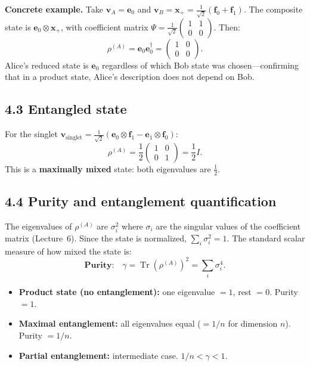 \documentclass[12pt,a4paper]{article}
\begin{document}
\medskip
\noindent\textbf{Concrete example.}  Take $\mathbf{v}_A = \mathbf{e}_0$ and $\mathbf{v}_B = \mathbf{x}_+ = \frac{1}{\sqrt{2}}(\mathbf{f}_0+\mathbf{f}_1)$.  The composite state is $\mathbf{e}_0\otimes\mathbf{x}_+$, with coefficient matrix $\Psi = \frac{1}{\sqrt{2}}\begin{pmatrix}1&1\\0&0\end{pmatrix}$.  Then:
\[
    \rho^{(A)} = \mathbf{e}_0\mathbf{e}_0^\dagger = \begin{pmatrix}1&0\\0&0\end{pmatrix}.
\]
Alice's reduced state is $\mathbf{e}_0$ regardless of which Bob state was chosen---confirming that in a product state, Alice's description does not depend on Bob.

\subsection{4.3 Entangled state}
For the singlet $\mathbf{v}_{\text{singlet}}=\frac{1}{\sqrt{2}}(\mathbf{e}_0\otimes\mathbf{f}_1-\mathbf{e}_1\otimes\mathbf{f}_0)$:
\[
    \rho^{(A)} = \frac{1}{2}\begin{pmatrix}1&0\\0&1\end{pmatrix} = \frac{1}{2}I.
\]
This is a \textbf{maximally mixed} state: both eigenvalues are $\frac{1}{2}$.

\medskip
\noindent{}

\subsection{4.4 Purity and entanglement quantification}
The eigenvalues of $\rho^{(A)}$ are $\sigma_i^2$ where $\sigma_i$ are the singular values of the coefficient matrix (Lecture~6).  Since the state is normalized, $\sum_i \sigma_i^2 = 1$.  The standard scalar measure of how mixed the state is:
\[
    \boxed{\textbf{Purity:}\quad \gamma = \operatorname{Tr}(\rho^{(A)})^2 = \sum_i \sigma_i^4.}
\]
\begin{itemize}[nosep]
    \item \textbf{Product state (no entanglement):} one eigenvalue $=1$, rest $=0$.  Purity $=1$.
    \item \textbf{Maximal entanglement:} all eigenvalues equal ($=1/n$ for dimension $n$).  Purity $=1/n$.
    \item \textbf{Partial entanglement:} intermediate case.  $1/n < \gamma < 1$.
\end{itemize}
\end{document}
